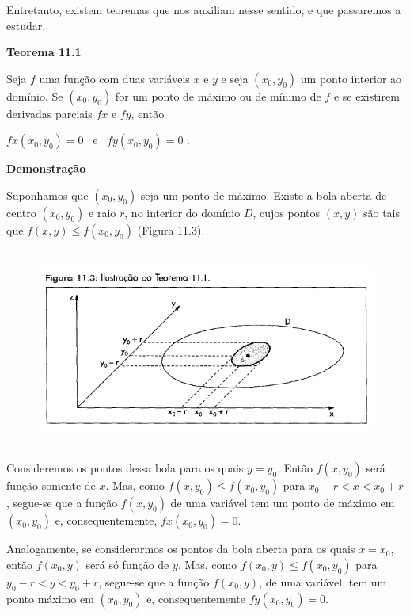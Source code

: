 		Entretanto, existem teoremas que nos auxiliam nesse sentido, e que passaremos a estudar.

		\bigskip

		\textbf{Teorema 11.1} \cite{morettin}

		\medskip

		Seja $f$ uma função com duas variáveis $x$ e $y$ e seja $(x_{0}, y_{0})$ um ponto interior ao domínio.
		Se $(x_{0}, y_{0})$ for um ponto de máximo ou de mínimo de $f$ e se existirem derivadas parciais $fx$ e $fy$, então

		\medskip

		$fx(x_{0}, y_{0}) = 0$ \ e \ $fy(x_{0}, y_{0}) = 0$ .

		\bigskip

		\textbf{Demonstração}

		\medskip

		Suponhamos que $(x_{0}, y_{0})$ seja um ponto de máximo. Existe a bola aberta de centro $(x_{0}, y_{0})$ e raio $r$, no interior do domínio $D$, cujos pontos $(x, y)$ são tais que $f(x, y) \leq f(x_{0}, y_{0})$ (Figura 11.3).

		\begin{figure}[H]
				\includegraphics[height=6.5cm]{images/morettin_figura-11-3}
		\end{figure}

		Consideremos os pontos dessa bola para os quais $y = y_{0}$. Então $f(x, y_{0})$ será função somente de $x$. Mas, como $f(x, y_{0}) \leq f(x_{0}, y_{0})$ para $x_{0} - r < x < x_{0} + r$, segue-se que a função $f(x, y_{0})$ de uma variável tem um ponto de máximo em $(x_{0}, y_{0})$ e, consequentemente, $fx(x_{0}, y_{0}) = 0$.

		Analogamente, se considerarmos os pontos da bola aberta para os quais $x = x_{0}$, então $f(x_{0}, y)$ será só função de $y$. Mas, como $f(x_{0}, y) \leq f(x_{0}, y_{0})$ para $y_{0} - r < y < y_{0} + r$, segue-se que a função $f(x_{0}, y)$, de uma variável, tem um ponto máximo em $(x_{0}, y_{0})$ e, consequentemente $fy(x_{0}, y_{0}) = 0$.

